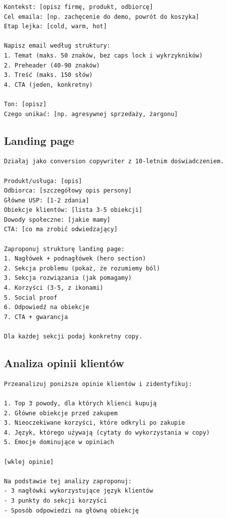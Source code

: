\documentclass[
  12pt,
  a4paper,
  twoside,
  openright,
  12pt,
  DIV=12,
  BCOR=12mm]{scrbook}
\begin{document}
\begin{verbatim}
Kontekst: [opisz firmę, produkt, odbiorcę]
Cel emaila: [np. zachęcenie do demo, powrót do koszyka]
Etap lejka: [cold, warm, hot]

Napisz email według struktury:
1. Temat (maks. 50 znaków, bez caps lock i wykrzykników)
2. Preheader (40-90 znaków)
3. Treść (maks. 150 słów)
4. CTA (jeden, konkretny)

Ton: [opisz]
Czego unikać: [np. agresywnej sprzedaży, żargonu]
\end{verbatim}

\subsection{Landing page}\label{landing-page-3}

\begin{verbatim}
Działaj jako conversion copywriter z 10-letnim doświadczeniem.

Produkt/usługa: [opis]
Odbiorca: [szczegółowy opis persony]
Główne USP: [1-2 zdania]
Obiekcje klientów: [lista 3-5 obiekcji]
Dowody społeczne: [jakie mamy]
CTA: [co ma zrobić odwiedzający]

Zaproponuj strukturę landing page:
1. Nagłówek + podnagłówek (hero section)
2. Sekcja problemu (pokaż, że rozumiemy ból)
3. Sekcja rozwiązania (jak pomagamy)
4. Korzyści (3-5, z ikonami)
5. Social proof
6. Odpowiedź na obiekcje
7. CTA + gwarancja

Dla każdej sekcji podaj konkretny copy.
\end{verbatim}

\subsection{Analiza opinii klientów}\label{analiza-opinii-klientuxf3w}

\begin{verbatim}
Przeanalizuj poniższe opinie klientów i zidentyfikuj:

1. Top 3 powody, dla których klienci kupują
2. Główne obiekcje przed zakupem
3. Nieoczekiwane korzyści, które odkryli po zakupie
4. Język, którego używają (cytaty do wykorzystania w copy)
5. Emocje dominujące w opiniach

[wklej opinie]

Na podstawie tej analizy zaproponuj:
- 3 nagłówki wykorzystujące język klientów
- 3 punkty do sekcji korzyści
- Sposób odpowiedzi na główną obiekcję
\end{verbatim}
\end{document}

